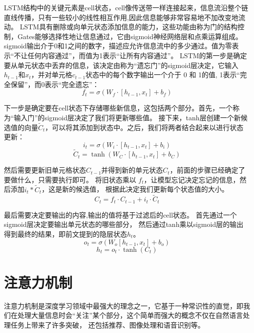 LSTM结构中的关键元素是cell状态\cite{zhang2016highway}，cell像传送带一样连接起来，信息流沿整个链直线传播，只有一些较小的线性相互作用,因此信息能够非常容易地不加改变地流动。
LSTM具有删除或向单元状态添加信息的能力，这些功能由称为门的结构控制，Gates能够选择性地让信息通过，它由sigmoid神经网络层和点乘运算组成。
sigmoid输出介于0和1之间的数字，描述应允许信息流中的多少通过。值为零表示“不让任何内容通过”，而值为1表示“让所有内容通过”。
LSTM的第一步是确定要从单元状态中丢弃的信息，该决定由称为“遗忘门”的sigmoid层决定，它输入$h_{t-1}$和$x_{t}$，并对单元格$c_{t-1}$状态中的每个数字输出一个介于 0 和 1的值,
1表示“完全保留”，而0表示“完全遗忘”：
\begin{equation}
  f_{t}=σ(W_{f}\cdot[h_{t-1},x_t]+b_{f})
  \end{equation}

  下一步是确定要在cell状态下存储哪些新信息，这包括两个部分。首先，一个称为“输入门”的sigmoid层决定了我们将更新哪些值。
  接下来，tanh层创建一个新候选值的向量$\tilde{C}_{t}$，可以将其添加到状态中。之后，我们将两者结合起来以进行状态更新：
  \begin{equation}
    i_{t} =\sigma\left(W_{i} \cdot\left[h_{t-1}, x_{t}\right]+b_{i}\right) 
  \end{equation}  
    \begin{equation}
      \tilde{C}_{t} =\tanh \left(W_{C} \cdot\left[h_{t-1}, x_{t}\right]+b_{C}\right)
      \end{equation}   

然后需要更新旧单元格状态$C_{t-1}$并得到新的单元状态$C_{t}$，前面的步骤已经确定了要做什么，只需要执行即可。
将旧状态乘以 $f_{t}$，让模型忘记决定忘记的信息，然后添加$i_{t} * \tilde{C}_{t}$，这是新的候选值，
根据此决定我们更新每个状态值的大小。
\begin{equation}
C_{t}=f_{t} \cdot C_{t-1}+i_{t} \cdot \tilde{C}_{t}
\end{equation} 

最后需要决定要输出的内容,输出的值将基于过滤后的cell状态。
首先通过一个sigmoid层决定要输出单元状态的哪些部分，
然后通过tanh乘以sigmoid层的输出得到最终的结果，即前文提到的隐层状态$h_{t}$。
\begin{equation}
  o_{t}=\sigma\left(W_{o}\left[h_{t-1}, x_{t}\right]+b_{o}\right)
\end{equation} 
\begin{equation}
  h_{t}=o_{t} \cdot \tanh \left(C_{t}\right)
\end{equation}


\section{注意力机制}
注意力机制是深度学习领域中最强大的理念之一，它基于一种常识性的直觉，即我们在处理大量信息时会“关注”某个部分，这个简单而强大的概念不仅在自然语言处理任务上带来了许多突破，
还包括推荐、图像处理和语音识别等。


